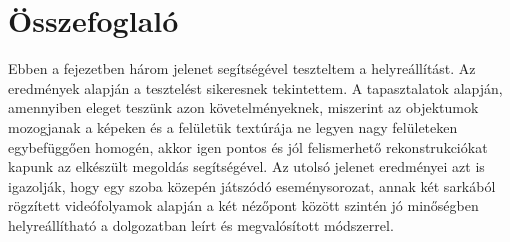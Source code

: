 \section{Összefoglaló}

Ebben a fejezetben három jelenet segítségével teszteltem a helyreállítást. Az eredmények alapján a tesztelést sikeresnek tekintettem. A tapasztalatok alapján, amennyiben eleget teszünk azon követelményeknek, miszerint az objektumok mozogjanak a képeken és a felületük textúrája ne legyen nagy felületeken egybefüggően homogén, akkor igen pontos és jól felismerhető rekonstrukciókat kapunk az elkészült megoldás segítségével. Az utolsó jelenet eredményei azt is igazolják, hogy egy szoba közepén játszódó eseménysorozat, annak két sarkából rögzített videófolyamok alapján a két nézőpont között szintén jó minőségben helyreállítható a dolgozatban leírt és megvalósított módszerrel.
